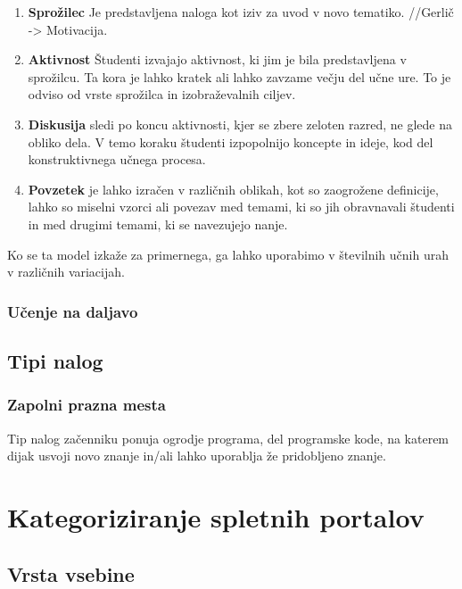 \begin{enumerate}
\item \textbf{Sprožilec} Je predstavljena naloga kot iziv za uvod v novo
tematiko.  //Gerlič -> Motivacija.
\item \textbf{Aktivnost} Študenti izvajajo aktivnost, ki jim je bila
predstavljena v sprožilcu. Ta kora je lahko kratek ali lahko
zavzame večju del učne ure. To je odviso od vrste sprožilca in
izobraževalnih ciljev.
\item \textbf{Diskusija} sledi po koncu aktivnosti, kjer se zbere zeloten
razred, ne glede na obliko dela. V temo koraku študenti izpopolnijo
koncepte in ideje, kod del konstruktivnega učnega procesa.
\item \textbf{Povzetek} je lahko izračen v različnih oblikah, kot so
zaogrožene definicije, lahko so miselni vzorci ali povezav med
temami, ki so jih obravnavali študenti in med drugimi temami, ki se
navezujejo nanje.
\end{enumerate}

Ko se ta model izkaže za primernega, ga lahko uporabimo v številnih
učnih urah v različnih variacijah.

\subsubsection{Učenje  na daljavo}
\label{sec:Učenje_na_daljavo}


\subsection{Tipi nalog}
\label{tipi_nalog}

\subsubsection{Zapolni prazna mesta}
\label{sec:zapolni_prazna_mesta}

Tip nalog začenniku ponuja ogrodje programa, del programske kode, na
katerem dijak usvoji novo znanje in/ali lahko uporablja že pridobljeno
znanje.


\section{Kategoriziranje spletnih portalov}
\label{sec:kategoriziranje_spletnih_portalov}

\subsection{Vrsta vsebine}
\label{sec:Razvrstitev_spletnih_portalov}

